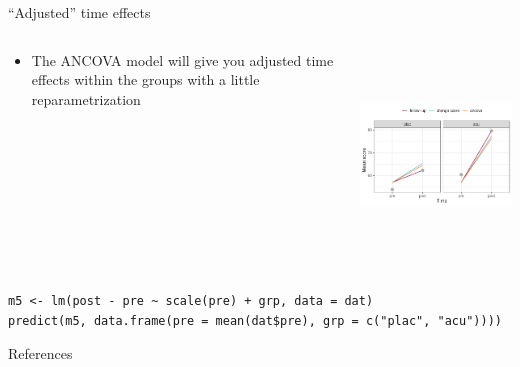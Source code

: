 \documentclass[aspectratio=169]{beamer}
\begin{document}
\begin{frame}[fragile]{``Adjusted'' time effects}
  \begin{columns}
    \begin{column}{.4\textwidth}
      \begin{itemize}
        \item The ANCOVA model will give you adjusted time effects within the
          groups with a little reparametrization
      \end{itemize}
    \end{column}
    \begin{column}{.6\textwidth}
      \includegraphics[height=5.5cm]{../figures/acu-timeeffects}
    \end{column}
  \end{columns}
\begin{lstlisting}
m5 <- lm(post - pre ~ scale(pre) + grp, data = dat)
predict(m5, data.frame(pre = mean(dat$pre), grp = c("plac", "acu"))))
\end{lstlisting}
\end{frame}


% 
% 

\appendix

\begin{frame}{References}
  \printbibliography
  \vfill
\end{frame}
\end{document}
